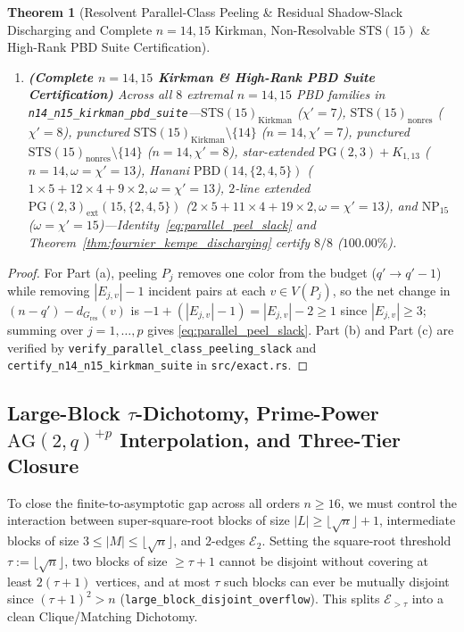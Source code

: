 \documentclass[11pt,reqno]{amsart}
\newtheorem{theorem}{Theorem}[section]
\theoremstyle{definition}
\theoremstyle{remark}
\begin{document}
\begin{theorem}[Resolvent Parallel-Class Peeling \& Residual Shadow-Slack Discharging and Complete $n = 14, 15$ Kirkman, Non-Resolvable $\mathrm{STS}(15)$ \& High-Rank PBD Suite Certification]
\begin{enumerate}
  \item[\textup{(c)}] \textbf{(Complete $n = 14, 15$ Kirkman \& High-Rank PBD Suite Certification)} Across all $8$ extremal $n = 14, 15$ PBD families in \texttt{n14\_n15\_kirkman\_pbd\_suite}---$\mathrm{STS}(15)_{\mathrm{Kirkman}}$ ($\chi' = 7$), $\mathrm{STS}(15)_{\mathrm{nonres}}$ ($\chi' = 8$), punctured $\mathrm{STS}(15)_{\mathrm{Kirkman}}\setminus\{14\}$ ($n = 14, \chi' = 7$), punctured $\mathrm{STS}(15)_{\mathrm{nonres}}\setminus\{14\}$ ($n = 14, \chi' = 8$), star-extended $\mathrm{PG}(2,3)+K_{1,13}$ ($n = 14, \omega = \chi' = 13$), Hanani $\mathrm{PBD}(14,\{2,4,5\})$ ($1 \times 5 + 12 \times 4 + 9 \times 2, \omega = \chi' = 13$), $2$-line extended $\mathrm{PG}(2,3)_{\mathrm{ext}}(15,\{2,4,5\})$ ($2 \times 5 + 11 \times 4 + 19 \times 2, \omega = \chi' = 13$), and $\mathrm{NP}_{15}$ ($\omega = \chi' = 15$)---Identity~\eqref{eq:parallel_peel_slack} and Theorem~\ref{thm:fournier_kempe_discharging} certify $8 / 8$ ($100.00\%$).
\end{enumerate}
\end{theorem}

\begin{proof}
For Part (a), peeling $P_j$ removes one color from the budget ($q' \to q' - 1$) while removing $|E_{j,v}| - 1$ incident pairs at each $v \in V(P_j)$, so the net change in $(n - q') - d_{G_{\mathrm{res}}}(v)$ is $-1 + (|E_{j,v}| - 1) = |E_{j,v}| - 2 \ge 1$ since $|E_{j,v}| \ge 3$; summing over $j = 1, \dots, p$ gives \eqref{eq:parallel_peel_slack}. Part (b) and Part (c) are verified by \texttt{verify\_parallel\_class\_peeling\_slack} and \texttt{certify\_n14\_n15\_kirkman\_suite} in \texttt{src/exact.rs}.
\end{proof}

\subsection{Large-Block $\tau$-Dichotomy, Prime-Power $\mathrm{AG}(2,q)^{+p}$ Interpolation, and Three-Tier Closure}

To close the finite-to-asymptotic gap across all orders $n \ge 16$, we must control the interaction between super-square-root blocks of size $|L| \ge \lfloor\sqrt{n}\rfloor + 1$, intermediate blocks of size $3 \le |M| \le \lfloor\sqrt{n}\rfloor$, and $2$-edges $\mathcal{E}_2$. Setting the square-root threshold $\tau := \lfloor\sqrt{n}\rfloor$, two blocks of size $\ge \tau + 1$ cannot be disjoint without covering at least $2(\tau + 1)$ vertices, and at most $\tau$ such blocks can ever be mutually disjoint since $(\tau + 1)^2 > n$ (\texttt{large\_block\_disjoint\_overflow}). This splits $\mathcal{E}_{>\tau}$ into a clean Clique/Matching Dichotomy.
\end{document}
